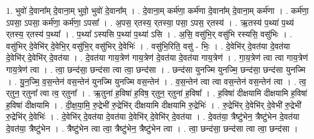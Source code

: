 \documentclass[17pt]{extarticle}
\begin{document}
1. भुवो॑ दे॒वाना᳚म् दे॒वाना॒म् भुवो॒ भुवो॑ दे॒वाना᳚म् । . दे॒वाना॒म् कर्म॑णा॒ कर्म॑णा दे॒वाना᳚म् दे॒वाना॒म् कर्म॑णा । . कर्म॑णा॒ ऽपसा॒ ऽपसा॒ कर्म॑णा॒ कर्म॑णा॒ ऽपसा᳚ । . अ॒पस॒ र्‌तस्य॒ र्‌तस्या॒ पसा॒ ऽपस॒ र्‌तस्य॑ । . ऋ॒तस्य॑ प॒थ्या॑ प॒थ्य॑ र्‌तस्य॒ र्‌तस्य॑ प॒थ्या᳚ । . प॒थ्या᳚ ऽस्यसि प॒थ्या॑ प॒थ्या॑ ऽसि । . अ॒सि॒ वसु॑भि॒र् वसु॑भि रस्यसि॒ वसु॑भिः । . वसु॑भिर् दे॒वेभि॑र् दे॒वेभि॒र् वसु॑भि॒र् वसु॑भिर् दे॒वेभिः॑ । . वसु॑भि॒रिति॒ वसु॑ - भिः॒ । . दे॒वेभि॑र् दे॒वत॑या दे॒वत॑या दे॒वेभि॑र् दे॒वेभि॑र् दे॒वत॑या । . दे॒वत॑या गाय॒त्रेण॑ गाय॒त्रेण॑ दे॒वत॑या दे॒वत॑या गाय॒त्रेण॑ । . गा॒य॒त्रेण॑ त्वा त्वा गाय॒त्रेण॑ गाय॒त्रेण॑ त्वा । . त्वा॒ छन्द॑सा॒ छन्द॑सा त्वा त्वा॒ छन्द॑सा । . छन्द॑सा युनज्मि युनज्मि॒ छन्द॑सा॒ छन्द॑सा युनज्मि । . यु॒न॒ज्मि॒ व॒स॒न्तेन॑ वस॒न्तेन॑ युनज्मि युनज्मि वस॒न्तेन॑ । . व॒स॒न्तेन॑ त्वा त्वा वस॒न्तेन॑ वस॒न्तेन॑ त्वा । . त्व॒ र्‌तुन॒ र्‌तुना᳚ त्वा त्व॒ र्‌तुना᳚ । . ऋ॒तुना॑ ह॒विषा॑ ह॒विष॒ र्‌तुन॒ र्‌तुना॑ ह॒विषा᳚ । . ह॒विषा॑ दीक्षयामि दीक्षयामि ह॒विषा॑ ह॒विषा॑ दीक्षयामि । . दी॒क्ष॒या॒मि॒ रु॒द्रेभी॑ रु॒द्रेभि॑र् दीक्षयामि दीक्षयामि रु॒द्रेभिः॑ । . रु॒द्रेभि॑र् दे॒वेभि॑र् दे॒वेभी॑ रु॒द्रेभी॑ रु॒द्रेभि॑र् दे॒वेभिः॑ । . दे॒वेभि॑र् दे॒वत॑या दे॒वत॑या दे॒वेभि॑र् दे॒वेभि॑र् दे॒वत॑या । . दे॒वत॑या॒ त्रैष्टु॑भेन॒ त्रैष्टु॑भेन दे॒वत॑या दे॒वत॑या॒ त्रैष्टु॑भेन । . त्रैष्टु॑भेन त्वा त्वा॒ त्रैष्टु॑भेन॒ त्रैष्टु॑भेन त्वा । . त्वा॒ छन्द॑सा॒ छन्द॑सा त्वा त्वा॒ छन्द॑सा । \newline
\end{document}
